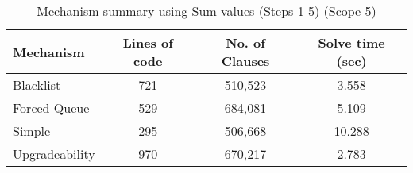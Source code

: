 \begin{table}[htbp]
\centering
\begin{tabular}{|l|c|c|c|}
\hline
\textbf{Mechanism} & \textbf{Lines of code} & \textbf{No. of Clauses} & \textbf{Solve time (sec)} \\
\hline
Blacklist & 721 & 510,523 & 3.558 \\
Forced Queue & 529 & 684,081 & 5.109 \\
Simple & 295 & 506,668 & 10.288 \\
Upgradeability & 970 & 670,217 & 2.783 \\
\hline
\end{tabular}
\caption{Mechanism summary using Sum values (Steps 1-5) (Scope 5)}
\label{tab:mechanism_summary_sum_steps_5}
\end{table}